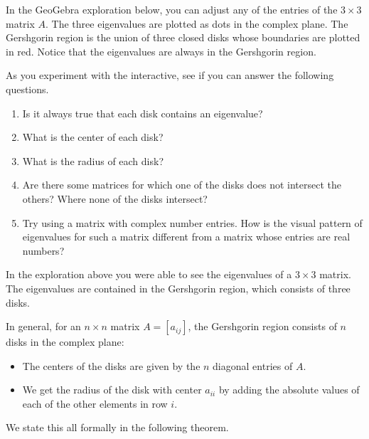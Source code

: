 \documentclass{ximera}
\begin{document}
\begin{exploration}\label{init:GershDisks3x3}
In the GeoGebra exploration below, you can adjust any of the entries of the $3 \times 3$ matrix $A$.  The three eigenvalues are plotted as dots in the complex plane.  The Gershgorin region is the union of three closed disks whose boundaries are plotted in red.  Notice that the eigenvalues are always in the Gershgorin region.

As you experiment with the interactive, see if you can answer the following questions.

\begin{enumerate}
    \item Is it always true that each disk contains an eigenvalue?  
    \item What is the center of each disk?
    \item What is the radius of each disk?
    \item Are there some matrices for which one of the disks does not intersect the others?  Where none of the disks intersect?
    \item Try using a matrix with complex number entries.  How is the visual pattern of eigenvalues for such a matrix different from a matrix whose entries are real numbers?
\end{enumerate}


\begin{onlineOnly}
\begin{center}
\end{center}
\end{onlineOnly}
\end{exploration}

In the exploration above you were able to see the eigenvalues of a $3 \times 3$ matrix.  The eigenvalues are contained in the Gershgorin region, which consists of three disks.  

In general, for an $n \times n$ matrix $A=[a_{ij}]$, the Gershgorin region consists of $n$ disks in the complex plane:  
\begin{itemize}
\item
The centers of the disks are given by the $n$ diagonal entries of $A$.  
\item
We get the radius of the disk with center $a_{ii}$ by adding the absolute values of each of the other elements in row $i$.  
\end{itemize}
We state this all formally in the following theorem.
\end{document}
